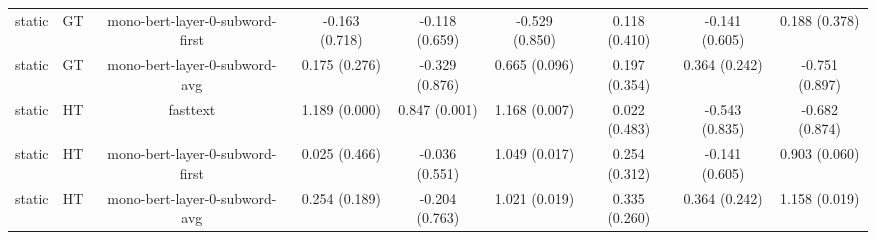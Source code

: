 \begin{sidewaystable}[htb]
\begin{tabular}{@{}ccccccccc@{}}
        static & GT & mono-bert-layer-0-subword-first & -0.163 (0.718) & -0.118 (0.659) & -0.529 (0.850) & 0.118 (0.410) & -0.141 (0.605) & 0.188 (0.378) \\
        static & GT & mono-bert-layer-0-subword-avg & 0.175 (0.276) & -0.329 (0.876) & 0.665 (0.096) & 0.197 (0.354) & 0.364 (0.242) & -0.751 (0.897) \\
        static & HT & fasttext & 1.189 (0.000) & 0.847 (0.001) & 1.168 (0.007) & 0.022 (0.483) & -0.543 (0.835) & -0.682 (0.874) \\
        static & HT & mono-bert-layer-0-subword-first & 0.025 (0.466) & -0.036 (0.551) & 1.049 (0.017) & 0.254 (0.312) & -0.141 (0.605) & 0.903 (0.060) \\
        static & HT & mono-bert-layer-0-subword-avg & 0.254 (0.189) & -0.204 (0.763) & 1.021 (0.019) & 0.335 (0.260) & 0.364 (0.242) & 1.158 (0.019) \\
        \bottomrule
    \end{tabular}
\end{sidewaystable}
